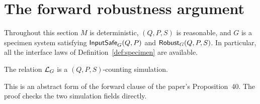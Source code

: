 \section{The forward robustness argument}

Throughout this section $M$ is deterministic, $(Q,P,S)$ is reasonable,
and $G$ is a specimen system satisfying $\mathsf{InputSafe}_G(Q,P)$ and
$\mathsf{Robust}_G(Q,P,S)$. In particular, all the interface laws of
Definition~\ref{def:specimen} are available.

\begin{theorem}
The relation $\mathcal L_G$ is a $(Q,P,S)$-counting simulation.
\end{theorem}
This is an abstract form of the forward clause of the paper's
Proposition~40. The proof checks the two simulation fields directly.

